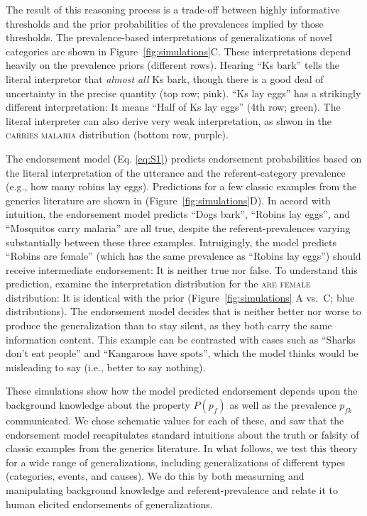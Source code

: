 \documentclass[english,floatsintext,man]{apa6}
\theoremstyle{definition}
\theoremstyle{definition}
\theoremstyle{definition}
\theoremstyle{remark}
\begin{document}
The result of this reasoning process is a trade-off between highly
informative thresholds and the prior probabilities of the prevalences
implied by those thresholds. The prevalence-based interpretations of
generalizations of novel categories are shown in
Figure~\ref{fig:simulations}C. These interpretations depend heavily on
the prevalence priors (different rows). Hearing \enquote{Ks bark} tells
the literal interpretor that \emph{almost all} Ks bark, though there is
a good deal of uncertainty in the precise quantity (top row; pink).
\enquote{Ks lay eggs} has a strikingly different interpretation: It
means \enquote{Half of Ks lay eggs} (4th row; green). The literal
interpreter can also derive very weak interpretation, as shwon in the
\textsc{carries malaria} distribution (bottom row, purple).

The endorsement model (Eq. \ref{eq:S1}) predicts endorsement
probabilities based on the literal interpretation of the utterance and
the referent-category prevalence (e.g., how many robins lay eggs).
Predictions for a few classic examples from the generics literature are
shown in (Figure~\ref{fig:simulations}D). In accord with intuition, the
endorsement model predicts \enquote{Dogs bark}, \enquote{Robins lay
eggs}, and \enquote{Mosquitos carry malaria} are all true, despite the
referent-prevalences varying substantially between these three examples.
Intruigingly, the model predicts \enquote{Robins are female} (which has
the same prevalence as \enquote{Robins lay eggs}) should receive
intermediate endorsement: It is neither true nor false. To understand
this prediction, examine the interpretation distribution for the
\textsc{are female} distribution: It is identical with the prior
(Figure~\ref{fig:simulations} A vs.~C; blue distributions). The
endorsement model decides that is neither better nor worse to produce
the generalization than to stay silent, as they both carry the same
information content. This example can be contrasted with cases such as
\enquote{Sharks don't eat people} and \enquote{Kangaroos have spots},
which the model thinks would be misleading to say (i.e., better to say
nothing).

These simulations show how the model predicted endorsement depends upon
the background knowledge about the property \(P(p_f)\) as well as the
prevalence \(p_{fk}\) communicated. We chose schematic values for each
of these, and saw that the endorsement model recapitulates standard
intuitions about the truth or falsity of classic examples from the
generics literature. In what follows, we test this theory for a wide
range of generalizations, including generalizations of different types
(categories, events, and causes). We do this by both measurning and
manipulating background knowledge and referent-prevalence and relate it
to human elicited endorsements of generalizations.
\end{document}
